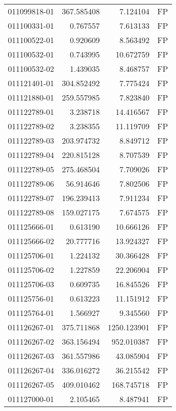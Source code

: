 \begin{tabular}{lrrl}
011099818-01 &  367.585408 &       7.124104 &   FP \\
011100331-01 &    0.767557 &       7.613133 &   FP \\
011100522-01 &    0.920609 &       8.563492 &   FP \\
011100532-01 &    0.743995 &      10.672759 &   FP \\
011100532-02 &    1.439035 &       8.468757 &   FP \\
011121401-01 &  304.852492 &       7.775424 &   FP \\
011121880-01 &  259.557985 &       7.823840 &   FP \\
011122789-01 &    3.238718 &      14.416567 &   FP \\
011122789-02 &    3.238355 &      11.119709 &   FP \\
011122789-03 &  203.974732 &       8.849712 &   FP \\
011122789-04 &  220.815128 &       8.707539 &   FP \\
011122789-05 &  275.468504 &       7.709026 &   FP \\
011122789-06 &   56.914646 &       7.802506 &   FP \\
011122789-07 &  196.239413 &       7.911234 &   FP \\
011122789-08 &  159.027175 &       7.674575 &   FP \\
011125666-01 &    0.613190 &      10.666126 &   FP \\
011125666-02 &   20.777716 &      13.924327 &   FP \\
011125706-01 &    1.224132 &      30.366428 &   FP \\
011125706-02 &    1.227859 &      22.206904 &   FP \\
011125706-03 &    0.609735 &      16.845526 &   FP \\
011125756-01 &    0.613223 &      11.151912 &   FP \\
011125764-01 &    1.566927 &       9.345560 &   FP \\
011126267-01 &  375.711868 &    1250.123901 &   FP \\
011126267-02 &  363.156494 &     952.010387 &   FP \\
011126267-03 &  361.557986 &      43.085904 &   FP \\
011126267-04 &  336.016272 &      36.215542 &   FP \\
011126267-05 &  409.010462 &     168.745718 &   FP \\
011127000-01 &    2.105465 &       8.487941 &   FP \\

\end{tabular}
